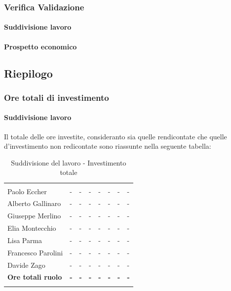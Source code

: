		\subsubsection{Verifica Validazione}
			\paragraph{Suddivisione lavoro}
			\paragraph{Prospetto economico}			
	\subsection{Riepilogo}
		\subsubsection{Ore totali di investimento}
			\paragraph{Suddivisione lavoro} \Spazio
			Il totale delle ore investite, consideranto sia quelle rendicontate che quelle d'investimento non redicontate sono riassunte nella seguente tabella:
					\begin{table}[H]
			\centering
			\begin{tabular}{C{4cm}|C{0.6cm}|C{0.6cm}|C{0.6cm}|C{0.6cm}|C{0.6cm}|C{0.6cm}|C{3cm}}
				 & & &&&&&\\
				Paolo Eccher & - & - & - & - & - & - & - \\
				Alberto Gallinaro & - & - & - & - & - & - & - \\
				Giuseppe Merlino & - & - & - & - & - & - & - \\
				Elia Montecchio & - & - & - & - & - & - & - \\
				Lisa Parma & - & - & - & - & - & - & - \\
				Francesco Parolini & - & - & - & - & - & - & - \\
				Davide Zago & - & - & - & - & - & - & - \\
				\textbf{Ore totali ruolo}  & \textbf{-} & \textbf{-} & \textbf{-} & \textbf{-} & \textbf{-} & \textbf{-} & \textbf{-} \\
			\end{tabular}
			\caption{Suddivisione del lavoro - Investimento totale }
			\end{table}
		
